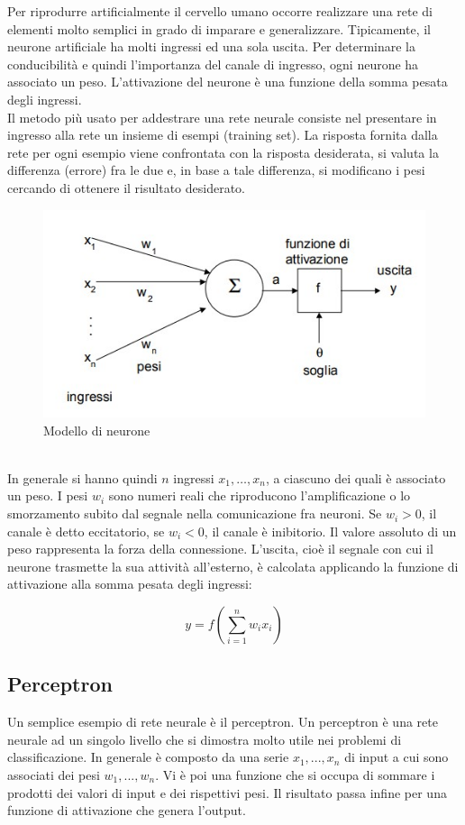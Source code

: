 \documentclass[a4paper,11pt]{article}
\begin{document}
    Per riprodurre artificialmente il cervello umano occorre realizzare
    una rete di elementi molto semplici in grado di imparare e generalizzare.
    Tipicamente, il neurone artificiale ha molti ingressi ed una sola uscita.
    Per determinare la conducibilità e quindi l'importanza del canale di ingresso, ogni neurone ha associato un peso. 
    L’attivazione del neurone è una funzione della somma pesata degli ingressi.\\[1in]
    Il metodo più usato per addestrare una rete neurale consiste nel presentare
    in ingresso alla rete un insieme di esempi (training set). 
    La risposta fornita dalla rete per ogni esempio viene confrontata con la risposta desiderata, si
    valuta la differenza (errore) fra le due e, in base a tale differenza, si
    modificano i pesi cercando di ottenere il risultato desiderato.
    \begin{figure}[h]
        \centering
        \includegraphics{neurone.jpg}
        \caption{Modello di neurone}
    \end{figure}
    \\In generale si hanno quindi $n$ ingressi $x_1, …, x_n$, a ciascuno dei quali è associato un peso. 
    I pesi $w_i$ sono numeri reali che riproducono l'amplificazione o lo smorzamento subito dal segnale nella comunicazione fra neuroni. Se $w_i > 0$, il canale è detto eccitatorio, se $w_i < 0$, il canale è inibitorio. 
    Il valore assoluto di un peso rappresenta la forza della connessione. 
    L’uscita, cioè il segnale con cui il neurone trasmette la sua attività
    all’esterno, è calcolata applicando la funzione di attivazione alla somma
    pesata degli ingressi:
    
    $$y = f(\sum_{i=1}^{n}w_i x_i)$$

    \subsection{Perceptron}
    Un semplice esempio di rete neurale è il perceptron. Un perceptron è una rete neurale ad un singolo livello che si dimostra molto utile nei problemi di classificazione.
    In generale è composto da una serie $x_1, ..., x_n$ di input a cui sono associati dei pesi $w_1, ..., w_n$. 
    Vi è poi una funzione che si occupa di sommare i prodotti dei valori di input e dei rispettivi pesi. 
    Il risultato passa infine per una funzione di attivazione che genera l'output.
\end{document}
